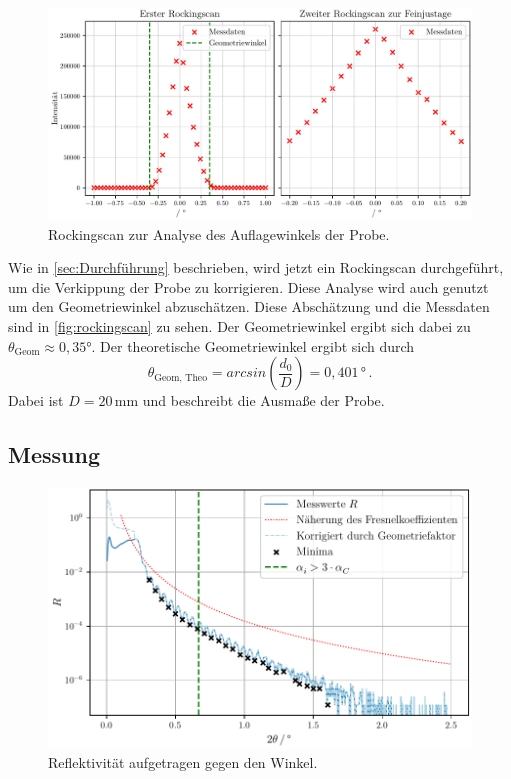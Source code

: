 \begin{figure}
    \centering
    \includegraphics[width = 0.5 \linewidth]{build/rockingscan.pdf}
    \caption{Rockingscan zur Analyse des Auflagewinkels der Probe.}
    \label{fig:rockingscan}
\end{figure}

Wie in \autoref{sec:Durchführung} beschrieben, wird jetzt ein Rockingscan durchgeführt, um die Verkippung der Probe zu korrigieren.
Diese Analyse wird auch genutzt um den Geometriewinkel abzuschätzen.
Diese Abschätzung und die Messdaten sind in \autoref{fig:rockingscan} zu sehen.
Der Geometriewinkel ergibt sich dabei zu $\theta_\text{Geom} \approx 0{,}35 °$.
Der theoretische Geometriewinkel ergibt sich durch 
\begin{equation*}
    \theta_\text{Geom, Theo} = arcsin\left(\frac{d_0}{D}\right) = 0{,}401 \, \unit\degree \, .
\end{equation*}
Dabei ist $D = 20 \, \unit{\milli\meter}$ und beschreibt die Ausmaße der Probe.

\subsection{Messung}

\begin{figure}
    \centering
    \includegraphics[width = 0.8 \linewidth]{build/messung1.pdf}
    \caption{Reflektivität aufgetragen gegen den Winkel.}
    \label{fig:messreihe1}
\end{figure}

